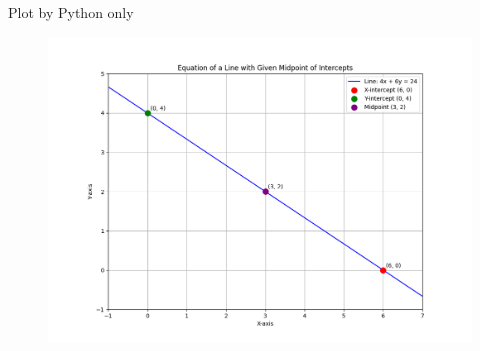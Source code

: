 \documentclass{beamer}
\begin{document}
\begin{frame}{Plot by Python only}
\begin{figure}[H]
\centering
\includegraphics[width=0.9\columnwidth]{../figs/fig2.png}
\caption{}
\label{fig:2}
\end{figure}
\end{frame}
\end{document}
